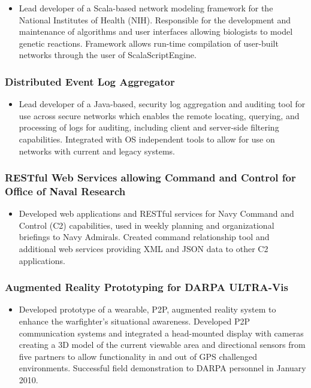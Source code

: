 \documentclass[11pt]{article}
\begin{document}
\begin{itemize}
\item Lead developer of a Scala-based network modeling framework for the National Institutes of Health (NIH). Responsible for the development and maintenance of algorithms and user interfaces allowing biologists to model genetic reactions. Framework allows run-time compilation of user-built networks through the user of ScalaScriptEngine.
\end{itemize}
\subsubsection*{Distributed Event Log Aggregator}
\label{sec-1-3-2}

\begin{itemize}
\item Lead developer of a Java-based, security log aggregation and auditing tool for use across secure networks which enables the remote locating, querying, and processing of logs for auditing, including client and server-side filtering capabilities. Integrated with OS independent tools to allow for use on networks with current and legacy systems.
\end{itemize}
\subsubsection*{RESTful Web Services allowing Command and Control for Office of Naval Research}
\label{sec-1-3-3}

\begin{itemize}
\item Developed web applications and RESTful services for Navy Command and Control (C2) capabilities, used in weekly planning and organizational briefings to Navy Admirals. Created command relationship tool and additional web services providing XML and JSON data to other C2 applications.
\end{itemize}
\subsubsection*{Augmented Reality Prototyping for DARPA ULTRA-Vis}
\label{sec-1-3-4}

\begin{itemize}
\item Developed prototype of a wearable, P2P, augmented reality system to enhance the warfighter's situational awareness. Developed P2P communication systems and integrated a head-mounted display with cameras creating a 3D model of the current viewable area and directional sensors from five partners to allow functionality in and out of GPS challenged environments. Successful field demonstration to DARPA personnel in January 2010.
\end{itemize}
\end{document}
